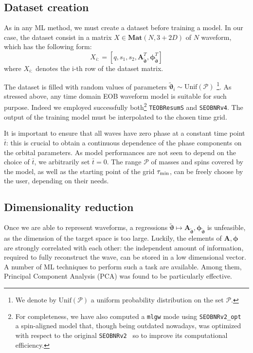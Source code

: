 \subsection{Dataset creation}
\label{sec:trainingset}
As in any ML method, we must create a dataset before training a model.
In our case, the dataset consist in a matrix ${X \in \mathbf{Mat}(N,3+2D)}$ of $N$ waveform, which has the following form:
\begin{equation} \label{eq:dataset}
	X_{i:} = [q,s_1,s_2, \boldsymbol{A}_{{\tilde{\boldsymbol{\vartheta}}}}^T, \boldsymbol{\phi}_{{\tilde{\boldsymbol{\vartheta}}}}^T]
\end{equation}
where $X_{i:}$ denotes the i-th row of the dataset matrix.

The dataset is filled with random values of parameters ${\tilde{\boldsymbol{\vartheta}}}_i \sim \textrm{Unif}(\mathcal{P})$
\footnote{We denote by $\textrm{Unif}(\mathcal{P})$ a uniform probability distribution on the set $\mathcal{P}$.}.
As stressed above, any time domain EOB waveform model is suitable for such purpose. Indeed we employed 
successfully both\footnote{For completeness, we have also computed a {\tt mlgw} 
mode using \texttt{SEOBNRv2\_opt}~\cite{Devine:2016ovp}  a spin-aligned model that, though being 
outdated nowadays, was optimized with respect to the original \texttt{SEOBNRv2}~\cite{Taracchini:2013rva} 
so to improve its computational efficiency.} \texttt{TEOBResumS} and \texttt{SEOBNRv4}.
The output of the training model must be interpolated to the chosen time grid.

It is important to ensure that all waves have zero phase at a constant
time point $\bar{t}$: this is crucial to obtain a continuous
dependence of the phase components on the orbital parameters. As model
performances are not seen to depend on the choice of
$\bar{t}$, we arbitrarily set $\bar{t} = 0$.
The range $\mathcal{P}$ of masses and spins covered by the model, as 
well as the starting point of the grid $\tau_{\rm min}$, can be freely choose 
by the user, depending on their needs.


\subsection{Dimensionality reduction}
Once we are able to represent waveforms, a regressions ${\tilde{\boldsymbol{\vartheta}}} \longmapsto \boldsymbol{A}_{{\tilde{\boldsymbol{\vartheta}}}}, \boldsymbol{\phi}_{{\tilde{\boldsymbol{\vartheta}}}}$ is unfeasible, as the dimension of the target space is too large. Luckily, the elements of $\boldsymbol{A}, \boldsymbol{\phi}$ are strongly correlated with each other: the independent amount of information, required to fully reconstruct the wave, can be stored in a low dimensional vector.
A number of ML techniques to perform such a task are available. Among them, Principal Component Analysis (PCA) \cite[ch. 12]{murphy2012machine} was found to be particularly effective.

